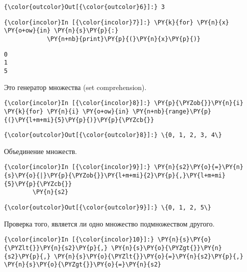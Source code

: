             \begin{Verbatim}[commandchars=\\\{\}]
{\color{outcolor}Out[{\color{outcolor}6}]:} 3
\end{Verbatim}
        
    \begin{Verbatim}[commandchars=\\\{\}]
{\color{incolor}In [{\color{incolor}7}]:} \PY{k}{for} \PY{n}{x} \PY{o+ow}{in} \PY{n}{s}\PY{p}{:}
            \PY{n+nb}{print}\PY{p}{(}\PY{n}{x}\PY{p}{)}
\end{Verbatim}

    \begin{Verbatim}[commandchars=\\\{\}]
0
1
5

    \end{Verbatim}

    Это генератор множества (set comprehension).

    \begin{Verbatim}[commandchars=\\\{\}]
{\color{incolor}In [{\color{incolor}8}]:} \PY{p}{\PYZob{}}\PY{n}{i} \PY{k}{for} \PY{n}{i} \PY{o+ow}{in} \PY{n+nb}{range}\PY{p}{(}\PY{l+m+mi}{5}\PY{p}{)}\PY{p}{\PYZcb{}}
\end{Verbatim}

            \begin{Verbatim}[commandchars=\\\{\}]
{\color{outcolor}Out[{\color{outcolor}8}]:} \{0, 1, 2, 3, 4\}
\end{Verbatim}
        
    Объединение множеств.

    \begin{Verbatim}[commandchars=\\\{\}]
{\color{incolor}In [{\color{incolor}9}]:} \PY{n}{s2}\PY{o}{=}\PY{n}{s}\PY{o}{|}\PY{p}{\PYZob{}}\PY{l+m+mi}{2}\PY{p}{,}\PY{l+m+mi}{5}\PY{p}{\PYZcb{}}
        \PY{n}{s2}
\end{Verbatim}

            \begin{Verbatim}[commandchars=\\\{\}]
{\color{outcolor}Out[{\color{outcolor}9}]:} \{0, 1, 2, 5\}
\end{Verbatim}
        
    Проверка того, является ли одно множество подмножеством другого.

    \begin{Verbatim}[commandchars=\\\{\}]
{\color{incolor}In [{\color{incolor}10}]:} \PY{n}{s}\PY{o}{\PYZlt{}}\PY{n}{s2}\PY{p}{,} \PY{n}{s}\PY{o}{\PYZgt{}}\PY{n}{s2}\PY{p}{,} \PY{n}{s}\PY{o}{\PYZlt{}}\PY{o}{=}\PY{n}{s2}\PY{p}{,} \PY{n}{s}\PY{o}{\PYZgt{}}\PY{o}{=}\PY{n}{s2}
\end{Verbatim}

